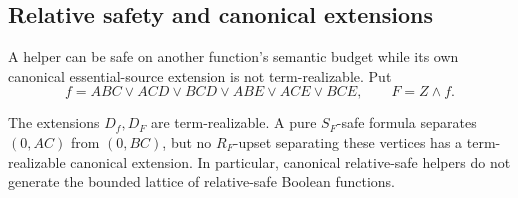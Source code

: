 \subsection{Relative safety and canonical extensions}
\label{app:core-relative-canonical}

A helper can be safe on another function's semantic budget while its own
canonical essential-source extension is not term-realizable.
Put
\[
 f=ABC\vee ACD\vee BCD\vee ABE\vee ACE\vee BCE,
 \qquad F=Z\land f.
\]
\begin{theorem}
\label{core:thm:relative-helper-not-canonical}
The extensions $D_f,D_F$ are term-realizable. A pure $S_F$-safe formula
separates $(0,AC)$ from $(0,BC)$, but no $R_F$-upset separating these
vertices has a term-realizable canonical extension. In particular,
canonical relative-safe helpers do not generate the bounded lattice of
relative-safe Boolean functions.
\end{theorem}
